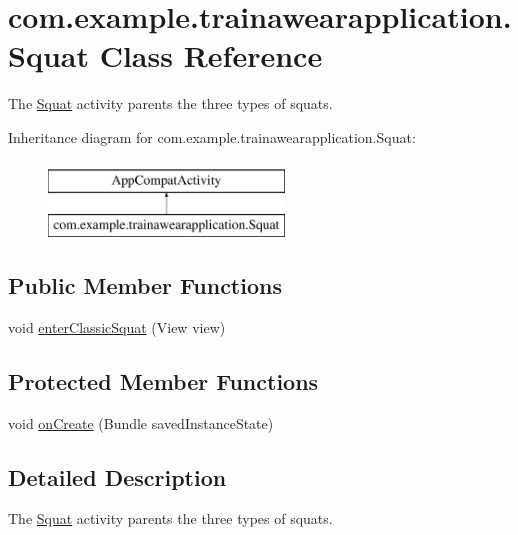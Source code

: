 \hypertarget{classcom_1_1example_1_1trainawearapplication_1_1_squat}{}\section{com.\+example.\+trainawearapplication.\+Squat Class Reference}
\label{classcom_1_1example_1_1trainawearapplication_1_1_squat}


The \mbox{\hyperlink{classcom_1_1example_1_1trainawearapplication_1_1_squat}{Squat}} activity parents the three types of squats.  


Inheritance diagram for com.\+example.\+trainawearapplication.\+Squat\+:\begin{figure}[H]
\begin{center}
\leavevmode
\includegraphics[height=2.000000cm]{classcom_1_1example_1_1trainawearapplication_1_1_squat}
\end{center}
\end{figure}
\subsection*{Public Member Functions}
\begin{DoxyCompactItemize}
\item 
void \mbox{\hyperlink{classcom_1_1example_1_1trainawearapplication_1_1_squat_aefefdea9b19687975d42841285ae8529}{enter\+Classic\+Squat}} (View view)
\end{DoxyCompactItemize}
\subsection*{Protected Member Functions}
\begin{DoxyCompactItemize}
\item 
void \mbox{\hyperlink{classcom_1_1example_1_1trainawearapplication_1_1_squat_a2ee401e1a295432f8196e77dcca9df5f}{on\+Create}} (Bundle saved\+Instance\+State)
\end{DoxyCompactItemize}


\subsection{Detailed Description}
The \mbox{\hyperlink{classcom_1_1example_1_1trainawearapplication_1_1_squat}{Squat}} activity parents the three types of squats. 

